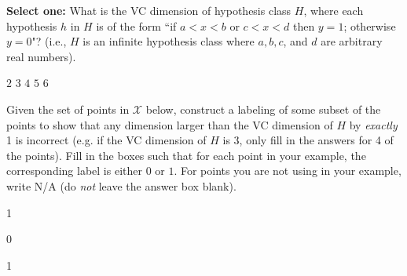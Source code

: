 \documentclass[11pt,addpoints,answers]{exam}
\newcommand{\Xc}{\mathcal{X}}
\newcommand{\sone}{\textbf{Select one: }}
\begin{document}
\begin{questions}
\begin{parts}
\begin{subparts}
\subpart[3] \sone What is the VC dimension of hypothesis class $H$, where each hypothesis $h$ in $H$ is of the form  ``if $a < x < b$ or $c < x < d$ then $y = 1$; otherwise $y = 0$"?  (i.e., $H$ is an infinite hypothesis class where $a, b, c$, and $d$ are arbitrary real numbers).
    \begin{checkboxes}
        \choice $2$
        \choice $3$
        \CorrectChoice $4$
        \choice $5$
        \choice $6$
    \end{checkboxes}

\subpart[3] Given the set of points in $\Xc$ below, construct a labeling of some subset of the points to show that any dimension larger than the VC dimension of $H$ by \emph{exactly} 1 is incorrect (e.g. if the VC dimension of $H$ is 3, only fill in the answers for 4 of the points). Fill in the boxes such that for each point in your example, the corresponding label is either $0$ or $1$. For points you are not using in your example, write N/A (do \textit{not} leave the answer box blank).

\usetikzlibrary{arrows}
\begin{center}
\end{center}

    \begin{your_solution}[title=Answer for $-3$,width=3.5cm,height=2cm]
        1
    \end{your_solution}
    \begin{your_solution}[title=Answer for $-2$,width=3.5cm,height=2cm]
        0
    \end{your_solution}
    \begin{your_solution}[title=Answer for $-1$,width=3.5cm,height=2cm]
        1
    \end{your_solution}
    

\end{subparts}
\end{parts}
\end{questions}
\end{document}
